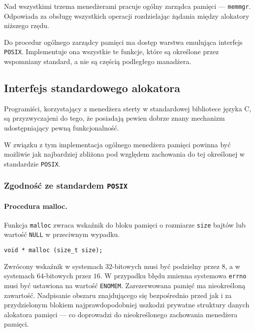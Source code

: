 \documentclass[12pt,a4paper,titlepage,twoside]{mwart}
\begin{document}
Nad wszystkimi trzema menedżerami pracuje ogólny zarządca pamięci ---
\texttt{memmgr}. Odpowiada za obsługę wszystkich operacji rozdzielając
żądania między alokatory niższego rzędu.

Do procedur ogólnego zarządcy pamięci ma dostęp warstwa emulująca interfejs
\texttt{POSIX}. Implementuje ona wszystkie te funkcje, które są określone przez
wspomniany standard, a nie są częścią podległego manadżera.

\newpage

\subsection{Interfejs standardowego alokatora}

\label{PosixMalloc}

Programiści, korzystający z menedżera sterty w standardowej bibliotece języka
C, są przyzwyczajeni do tego, że posiadają pewien dobrze znany mechanizm
udostępniający pewną funkcjonalność.

W związku z tym implementacja ogólnego menedżera pamięci powinna być możliwie
jak najbardziej zbliżona pod względem zachowania do tej określonej w
standardzie \texttt{POSIX}.

\subsubsection{Zgodność ze standardem \texttt{POSIX}}

\paragraph{Procedura malloc.}

Funkcja \texttt{malloc} zwraca wskaźnik do bloku pamięci o rozmiarze
\texttt{size} bajtów lub wartość \texttt{NULL} w przeciwnym wypadku.

\vspace{2ex}
\begin{lstlisting}[caption={Prototyp procedury \texttt{malloc}.}]
void * malloc (size_t size);
\end{lstlisting}

Zwrócony wskaźnik w systemach $32$-bitowych musi być podzielny przez $8$, a w
systemach $64$-bitowych przez $16$. W przypadku błędu zmienna systemowa
\texttt{errno} musi być ustawiona na wartość \texttt{ENOMEM}. Zarezerwowana
pamięć ma nieokreśloną zawartość. Nadpisanie obszaru znajdującego się
bezpośrednio przed jak i za przydzielonym blokiem najprawdopodobniej uszkodzi
prywatne struktury danych alokatora pamięci --- co doprowadzi do nieokreślonego
zachowania menedżera pamięci.
\end{document}
